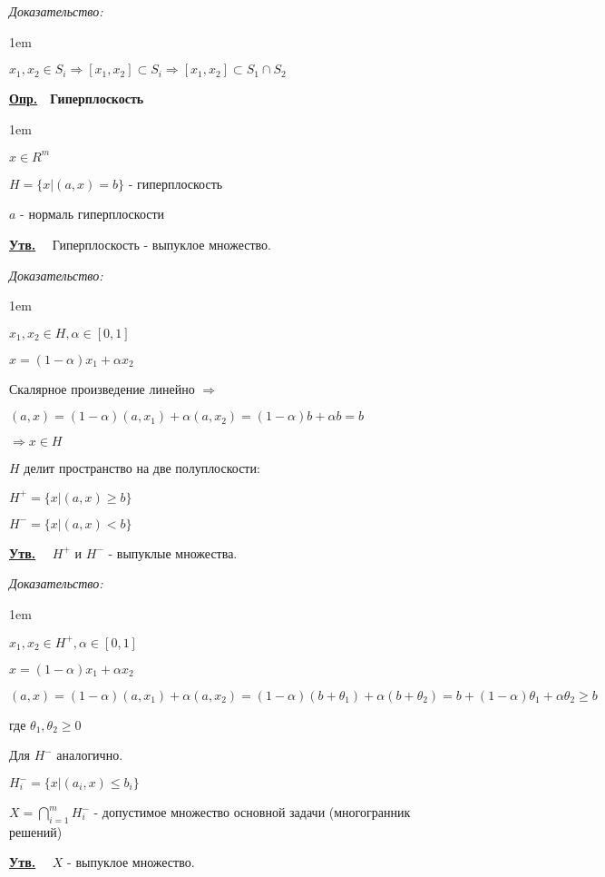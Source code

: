 \documentclass[11pt]{article}
\newenvironment{df}[1]{
  \underline{\textbf{Опр.}}\ \ \textbf{#1}
  
  \begin{adjustwidth}{1em}{}
}{
  \end{adjustwidth}
}
\newenvironment{proof}{
  \textit{Доказательство:}
    
  \begin{adjustwidth}{1em}{}
}{
  \end{adjustwidth}
}
\newenvironment{statement}{
  \underline{\textbf{Утв.}}\ \ }{
  
}
\begin{document}
\begin{sloppypar}
\begin{proof}
  $x_1, x_2 \in S_i \Rightarrow [x_1, x_2] \subset S_i \Rightarrow [x_1, x_2] \subset S_1 \cap S_2$
\end{proof}

\begin{df}{Гиперплоскость}
  $x \in R^m$

  $H = \{x|(a, x) = b\}$ - гиперплоскость
  
  $a$ - нормаль гиперплоскости
\end{df}

\begin{statement}
  Гиперплоскость - выпуклое множество.
\end{statement}
\begin{proof}
  $x_1, x_2 \in H, \alpha \in [0, 1]$
  
  $x = (1 - \alpha)x_1 + \alpha x_2$
  
  Скалярное произведение линейно $\Rightarrow$
  
  $(a, x) = (1 - \alpha)(a, x_1) + \alpha (a, x_2) = (1 - \alpha) b + \alpha b = b$
  
  $\Rightarrow x \in H$
\end{proof}

$H$ делит пространство на две полуплоскости:

$H^+ = \{x|(a, x) \geq b\}$

$H^- = \{x|(a, x) < b\}$

\begin{statement}
  $H^+$ и $H^-$ - выпуклые множества.
\end{statement}
\begin{proof}
  $x_1, x_2 \in H^+, \alpha \in [0, 1]$
  
  $x = (1 - \alpha)x_1 + \alpha x_2$
  
  $(a, x) = (1 - \alpha)(a, x_1) + \alpha (a, x_2) = (1 - \alpha)(b + \theta_1) + \alpha (b + \theta_2) = b + (1 - \alpha)\theta_1  + \alpha\theta_2  \geq b$
  
  где $\theta_1, \theta_2 \geq 0$
  
  Для $H^-$ аналогично.
\end{proof}

$H^-_i = \{x|(a_i, x) \leq b_i\}$
  
$X = \bigcap\limits_{i = 1}^m H^-_i$ - допустимое множество основной задачи (многогранник решений)

\begin{statement}
  $X$ - выпуклое множество.
\end{statement}


\end{sloppypar}
\end{document}
